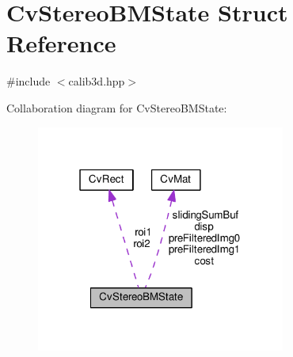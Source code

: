 \hypertarget{structCvStereoBMState}{\section{Cv\-Stereo\-B\-M\-State Struct Reference}
\label{structCvStereoBMState}
}


{\ttfamily \#include $<$calib3d.\-hpp$>$}



Collaboration diagram for Cv\-Stereo\-B\-M\-State\-:\nopagebreak
\begin{figure}[H]
\begin{center}
\leavevmode
\includegraphics[width=232pt]{structCvStereoBMState__coll__graph}
\end{center}
\end{figure}
